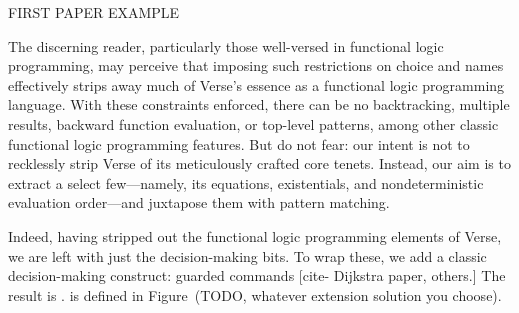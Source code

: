 \documentclass[manuscript,screen,review, 12pt]{acmart}
\begin{document}
        FIRST PAPER EXAMPLE 

        

        
        
        
        


        The discerning reader, particularly those well-versed in functional
        logic programming, may perceive that imposing such restrictions on
        choice and names effectively strips away much of Verse's essence as a
        functional logic programming language. With these constraints enforced,
        there can be no backtracking, multiple results, backward function
        evaluation, or top-level patterns, among other classic functional logic
        programming features. But do not fear: our intent is not to recklessly
        strip Verse of its meticulously crafted core tenets. Instead, our aim is
        to extract a select few—namely, its equations, existentials, and
        nondeterministic evaluation order—and juxtapose them with pattern
        matching.

    

        Indeed, having stripped out the functional logic programming elements of
        Verse, we are left with just the decision-making bits. To wrap these, we
        add a classic decision-making construct: guarded commands [cite-
        Dijkstra paper, others.] The result is \VMinus. \VMinus is defined in 
        Figure~(TODO, whatever extension solution you choose). 

        
        
        
\end{document}
